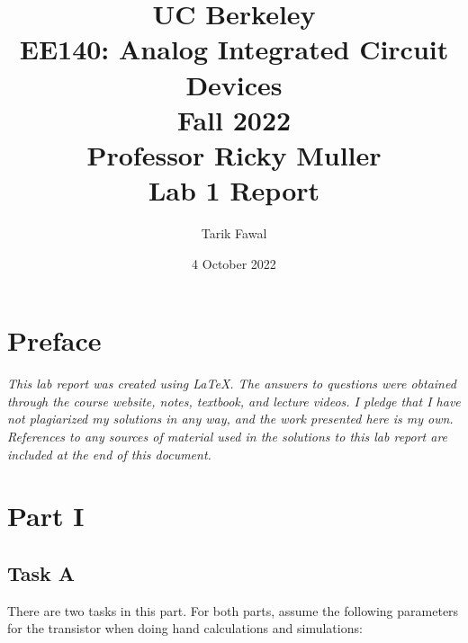 \documentclass[12pt, fleqn]{article}
\title {
    \normalsize{UC Berkeley}\\
    \large{{EE140: Analog Integrated Circuit Devices\\Fall 2022\\Professor Ricky Muller\\}}
    \vspace{0.5ex}
    \Huge{Lab 1 Report}
    \vspace{0.5ex}
}
\author{Tarik Fawal}
\date{4 October 2022}
\begin{document}
\maketitle
\tableofcontents
\flushbottom
    \section*{Preface}
        \textit{\emph{This lab report was created using \LaTeX.  The answers to questions were obtained through the course website, notes, textbook, and lecture videos.  I pledge that I have not plagiarized my solutions in any way, and the work presented here is my own.  References to any sources of material used in the solutions to this lab report are included at the end of this document.}}
\newpage
\section{Part I}
\subsection{Task A}

There are two tasks in this part. For both parts, assume the following parameters for the transistor when doing hand calculations and simulations:
\end{document}
